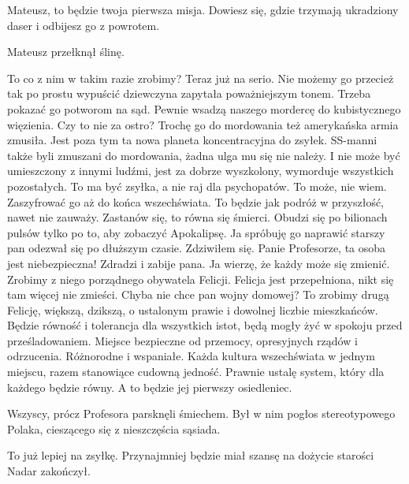 \begin{dialogue}
\ds{} Mateusz, to będzie twoja pierwsza misja. Dowiesz się, gdzie trzymają ukradziony daser i odbijesz go z powrotem. 
\end{dialogue}

Mateusz przełknął ślinę.

\begin{dialogue}
\ds{} To co z nim w takim razie zrobimy? Teraz już na serio. Nie możemy go przecież tak po prostu wypuścić \dm{} dziewczyna zapytała poważniejszym tonem.
\ds{} Trzeba pokazać go potworom na sąd. Pewnie wsadzą naszego mordercę do kubistycznego więzienia.
\ds{} Czy to nie za ostro? Trochę go do mordowania też amerykańska armia zmusiła. Jest poza tym ta nowa planeta koncentracyjna do zsyłek.
\ds{} SS-manni także byli zmuszani do mordowania, żadna ulga mu się nie należy. 
I nie może być umieszczony z innymi ludźmi, jest za dobrze wyszkolony, wymorduje wszystkich pozostałych. To ma być zsyłka, a nie raj dla psychopatów.
\ds{} To może, nie wiem. Zaszyfrować go aż do końca wszechświata. To będzie jak podróż w przyszłość, nawet nie zauważy.
\ds{} Zastanów się, to równa się śmierci. Obudzi się po bilionach pulsów tylko po to, aby zobaczyć Apokalipsę.
\ds{} Ja spróbuję go naprawić \dm{} starszy pan odezwał się po dłuższym czasie. Zdziwiłem się.
\ds{} Panie Profesorze, ta osoba jest niebezpieczna! Zdradzi i zabije pana.
\ds{} Ja wierzę, że każdy może się zmienić. Zrobimy z niego porządnego obywatela Felicji.
\ds{} Felicja jest przepełniona, nikt się tam więcej nie zmieści. Chyba nie chce pan wojny domowej?
\ds{} To zrobimy drugą Felicję, większą, dzikszą, o ustalonym prawie i dowolnej liczbie mieszkańców. Będzie równość i tolerancja dla wszystkich istot, będą mogły żyć w spokoju przed prześladowaniem.
Miejsce bezpieczne od przemocy, opresyjnych rządów i odrzucenia. Różnorodne i wspaniałe. Każda kultura wszechświata w jednym miejscu, razem stanowiące cudowną jedność.
Prawnie ustalę system, który dla każdego będzie równy.
A to będzie jej pierwszy osiedleniec.
\end{dialogue}

Wszyscy, prócz Profesora parsknęli śmiechem.
Był w nim pogłos stereotypowego Polaka, cieszącego się z nieszczęścia sąsiada.

\begin{dialogue}
\ds{} To już lepiej na zsyłkę. Przynajmniej będzie miał szansę na dożycie starości \dm{} Nadar zakończył.
\end{dialogue}

